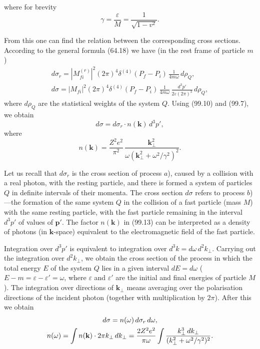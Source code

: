 
where for brevity
\[
\gamma = \frac{\varepsilon}{M} = \frac{1}{\sqrt{1 - v^2}}.
\]

From this one can find the relation between the corresponding cross sections. According to the general formula (64.18) we have (in the rest frame of particle $m$)
\begin{gather*}
d\sigma_r = |M_{fi}^{(r)}|^2(2\pi)^4\delta^{(4)}(P_f - P_i)\,\frac{1}{4m\omega}\,d\rho_Q, \\
d\sigma = |M_{fi}|^2(2\pi)^4\delta^{(4)}(P_f - P_i)\,\frac{1}{4m\omega}\,\frac{d^3p'}{2\varepsilon(2\pi)^3}\,d\rho_Q,
\end{gather*}
where $d\rho_Q$ are the statistical weights of the system $Q$. Using (99.10) and (99.7), we obtain
\begin{equation}
d\sigma = d\sigma_r\cdot n(\mathbf{k})\,d^3p',
\label{eq:99.13}
\end{equation}
where
\begin{equation}
n(\mathbf{k}) = \frac{Z^2e^2}{\pi^2}\,\frac{\mathbf{k}_\perp^2}{\omega(\mathbf{k}_\perp^2 + \omega^2/\gamma^2)^2}.
\label{eq:99.14}
\end{equation}

Let us recall that $d\sigma_r$ is the cross section of process $a$), caused by a collision with a real photon, with the resting particle, and there is formed a system of particles $Q$ in definite intervals of their momenta. The cross section $d\sigma$ refers to process $b$)---the formation of the same system $Q$ in the collision of a fast particle (mass $M$) with the same resting particle, with the fast particle remaining in the interval $d^3p'$ of values of $\mathbf{p}'$. The factor $n(\mathbf{k})$ in (99.13) can be interpreted as a density of photons (in $\mathbf{k}$-space) equivalent to the electromagnetic field of the fast particle.

Integration over $d^3p'$ is equivalent to integration over $d^3k = d\omega\,d^2k_\perp$. Carrying out the integration over $d^2k_\perp$, we obtain the cross section of the process in which the total energy $E$ of the system $Q$ lies in a given interval $dE = d\omega$ ($E - m = \varepsilon - \varepsilon' = \omega$, where $\varepsilon$ and $\varepsilon'$ are the initial and final energies of particle $M$). The integration over directions of $\mathbf{k}_\perp$ means averaging over the polarisation directions of the incident photon (together with multiplication by $2\pi$). After this we obtain
\begin{gather}
d\sigma = n(\omega)\,d\sigma_r\,d\omega, \notag \\
n(\omega) = \int n(\mathbf{k})\cdot 2\pi k_\perp\,dk_\perp = \frac{2Z^2e^2}{\pi\omega}\int\frac{k_\perp^3\,dk_\perp}{(k_\perp^2 + \omega^2/\gamma^2)^2}. \label{eq:99.15}
\end{gather}

